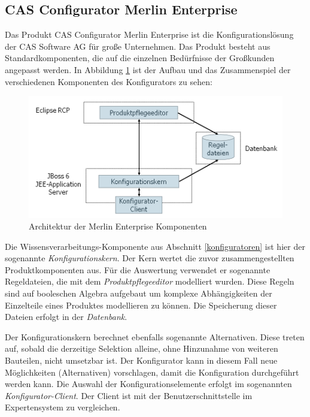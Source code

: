 \subsection{CAS Configurator Merlin Enterprise} \label{configurator}
Das Produkt CAS Configurator Merlin Enterprise ist die Konfigurationslösung der CAS Software AG für große Unternehmen. Das Produkt besteht aus Standardkomponenten, die auf die einzelnen Bedürfnisse der Großkunden angepasst werden. In Abbildung \ref{airbus_structure} ist der Aufbau und das Zusammenspiel der verschiedenen Komponenten des Konfigurators zu sehen: \par
\begin{figure}
\centering
\includegraphics[width=\hsize]{images/AirbusAufbau}
\caption{Architektur der Merlin Enterprise Komponenten}
\label{airbus_structure}
\end{figure}
Die Wissensverarbeitungs-Komponente aus Abschnitt \ref{konfiguratoren} ist hier der sogenannte \textit{Konfigurationskern}. Der Kern wertet die zuvor zusammengestellten Produktkomponenten aus. Für die Auswertung verwendet er sogenannte Regeldateien, die mit dem \textit{Produktpflegeeditor} modelliert wurden. Diese Regeln sind auf booleschen Algebra aufgebaut um komplexe Abhängigkeiten der Einzelteile eines Produktes modellieren zu können. Die Speicherung dieser Dateien erfolgt in der \textit{Datenbank}.
\par
 Der Konfigurationskern berechnet ebenfalls sogenannte Alternativen. Diese treten auf, sobald die derzeitige Selektion alleine, ohne Hinzunahme von weiteren Bauteilen, nicht umsetzbar ist. Der Konfigurator kann in diesem Fall neue Möglichkeiten (Alternativen) vorschlagen, damit die Konfiguration durchgeführt werden kann. Die Auswahl der Konfigurationselemente erfolgt im sogenannten \textit{Konfigurator-Client}. Der Client ist mit der Benutzerschnittstelle im Expertensystem zu vergleichen. \par

